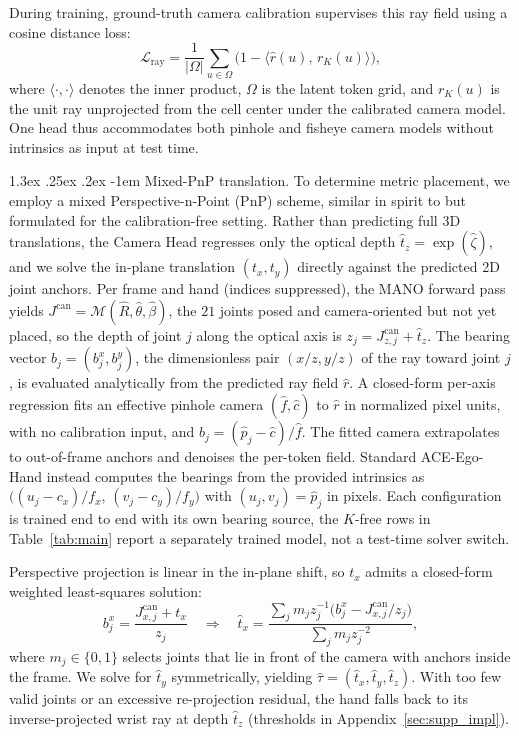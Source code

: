 \documentclass[10pt,twocolumn,letterpaper]{article}
\makeatletter
\renewcommand\paragraph{\@startsection{paragraph}{4}{\z@}%
  {1.3ex \@plus .25ex \@minus .2ex}%
  {-1em}%
  {\normalfont\normalsize\bfseries}}
\newcommand{\method}{ACE-Ego-Hand} %
\makeatother
\begin{document}
During training, ground-truth camera calibration supervises this ray field using a cosine distance loss:
\begin{equation}
\mathcal{L}_{\mathrm{ray}} = \frac{1}{|\Omega|} \sum_{u\in\Omega} \big(1 - \langle \hat r(u),\, r_K(u) \rangle\big),
\label{eq:ray}
\end{equation}
where $\langle\cdot,\cdot\rangle$ denotes the inner product, $\Omega$ is the latent token grid, and $r_K(u)$ is the unit ray unprojected from the cell center under the calibrated camera model. One head thus accommodates both pinhole and fisheye camera models without intrinsics as input at test time.

\paragraph{Mixed-PnP translation.}
To determine metric placement, we employ a mixed Perspective-n-Point (PnP) scheme, similar in spirit to \citet{vidihand2026} but formulated for the calibration-free setting. Rather than predicting full 3D translations, the Camera Head regresses only the optical depth $\hat t_z = \exp(\hat\zeta)$, and we solve the in-plane translation $(t_x, t_y)$ directly against the predicted 2D joint anchors. Per frame and hand (indices suppressed), the MANO forward pass yields $J^{\mathrm{can}} = \mathcal{M}(\hat R, \hat\theta, \hat\beta)$, the $21$ joints posed and camera-oriented but not yet placed, so the depth of joint $j$ along the optical axis is $z_j = J^{\mathrm{can}}_{z,j} + \hat t_z$. The bearing vector $b_j = (b^x_j, b^y_j)$, the dimensionless pair $(x/z, y/z)$ of the ray toward joint $j$, is evaluated analytically from the predicted ray field $\hat r$. A closed-form per-axis regression fits an effective pinhole camera $(\hat f, \hat c)$ to $\hat r$ in normalized pixel units, with no calibration input, and $b_j = (\hat p_j - \hat c)/\hat f$. The fitted camera extrapolates to out-of-frame anchors and denoises the per-token field. Standard \method{} instead computes the bearings from the provided intrinsics as $\big((u_j{-}c_x)/f_x,\,(v_j{-}c_y)/f_y\big)$ with $(u_j, v_j) = \hat p_j$ in pixels. Each configuration is trained end to end with its own bearing source, the $K$-free rows in Table~\ref{tab:main} report a separately trained model, not a test-time solver switch.

Perspective projection is linear in the in-plane shift, so $t_x$ admits a closed-form weighted least-squares solution:
\begin{equation}
b^x_j = \frac{J^{\mathrm{can}}_{x,j} + t_x}{z_j} 
\quad \Rightarrow \quad 
\hat t_x = \frac{\sum_j m_j z_j^{-1} \big(b^x_j - J^{\mathrm{can}}_{x,j} / z_j\big)}{\sum_j m_j z_j^{-2}},
\label{eq:pnp}
\end{equation}
where $m_j \in \{0, 1\}$ selects joints that lie in front of the camera with anchors inside the frame. We solve for $\hat t_y$ symmetrically, yielding $\hat\tau = (\hat t_x, \hat t_y, \hat t_z)$. With too few valid joints or an excessive re-projection residual, the hand falls back to its inverse-projected wrist ray at depth $\hat t_z$ (thresholds in Appendix~\ref{sec:supp_impl}).
\end{document}
